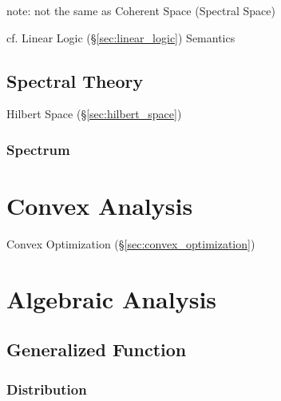 note: not the same as Coherent Space (Spectral Space)

cf. Linear Logic (\S\ref{sec:linear_logic}) Semantics



\subsection{Spectral Theory}\label{sec:spectral_theory}

Hilbert Space (\S\ref{sec:hilbert_space})



\subsubsection{Spectrum}\label{sec:spectrum}



\section{Convex Analysis}\label{sec:convex_analysis}

Convex Optimization (\S\ref{sec:convex_optimization})



\section{Algebraic Analysis}\label{sec:algebraic_analysis}

\subsection{Generalized Function}\label{sec:generalized_function}

\subsubsection{Distribution}\label{sec:distribution}


